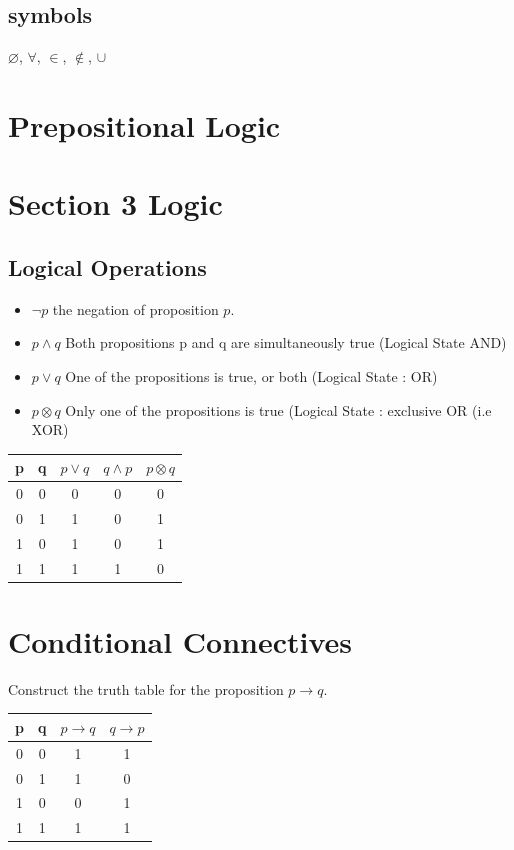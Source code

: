 \documentclass{article}
\begin{document}
\subsection*{symbols}
$\varnothing$,
$\forall$,
$\in$,
$\notin$,
$\cup$
\newpage

\section*{Prepositional Logic}


\newpage
\section{Section 3 Logic}
\subsection{Logical Operations}
\begin{itemize}
	\item $\neg p$ the negation of proposition $p$.
	\item $p \wedge q$ Both propositions p and q are simultaneously true (Logical State AND)
	\item $p \vee q $ One of the propositions is true, or both (Logical State : OR)
	\item $p \otimes q$ Only one of the propositions is true (Logical State : exclusive OR (i.e XOR)
\end{itemize}
\begin{center}
	\begin{tabular}{|c|c|c|c|c|}
		\hline
		p & q & $p \vee q$ & $q \wedge p$ & $p \otimes q$ \\
		\hline
		0 & 0 & 0 & 0 & 0 \\
		0 & 1 & 1 & 0 & 1\\
		1 & 0 & 1 & 0 & 1 \\
		1 & 1 & 1 & 1 & 0\\
		\hline
	\end{tabular}
\end{center}
\section{Conditional Connectives}
Construct the truth table for the proposition $p \rightarrow q$.

\begin{center}
	\begin{tabular}{|c|c|c|c|}
		\hline
		p & q & $p \rightarrow q$ & $q \rightarrow p$ \\
		\hline
		0 & 0 & 1& 1 \\
		0 & 1 & 1 & 0 \\
		1 & 0 & 0 & 1 \\
		1 & 1 & 1 & 1 \\
		\hline
	\end{tabular}
\end{center}
\end{document}
